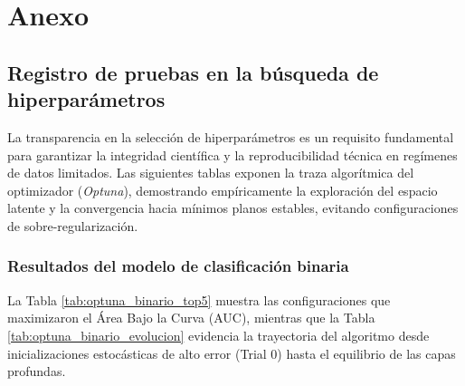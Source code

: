 \documentclass[12pt, oneside, english, spanish]{book}
\begin{document}
\cleardoublepage %

\appendix %

\renewcommand{\chaptername}{Apéndice} 
\renewcommand{\thesection}{\thechapter.\arabic{section}} 
\renewcommand{\thesubsection}{\thesection.\arabic{subsection}} 

\chapter{Anexo} \label{chap:material_suplementario}

\section{Registro de pruebas en la búsqueda de hiperparámetros} \label{sec:auditoria_hpt_extendida}
La transparencia en la selección de hiperparámetros es un requisito fundamental para garantizar la integridad científica y la reproducibilidad técnica en regímenes de datos limitados.
Las siguientes tablas exponen la traza algorítmica del optimizador (\textit{Optuna}), demostrando empíricamente la exploración del espacio latente y la convergencia hacia mínimos planos estables, evitando configuraciones de sobre-regularización.

\subsection{Resultados del modelo de clasificación binaria} \label{subsec:telemetria_binario}

La Tabla \ref{tab:optuna_binario_top5} muestra las configuraciones que maximizaron el Área Bajo la Curva (AUC), mientras que la Tabla \ref{tab:optuna_binario_evolucion} evidencia la trayectoria del algoritmo desde inicializaciones estocásticas de alto error (Trial 0) hasta el equilibrio de las capas profundas.
\end{document}
